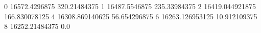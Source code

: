 0 16572.4296875 320.21484375
1 16487.5546875 235.33984375
2 16419.044921875 166.830078125
4 16308.869140625 56.654296875
6 16263.126953125 10.912109375
8 16252.21484375 0.0
